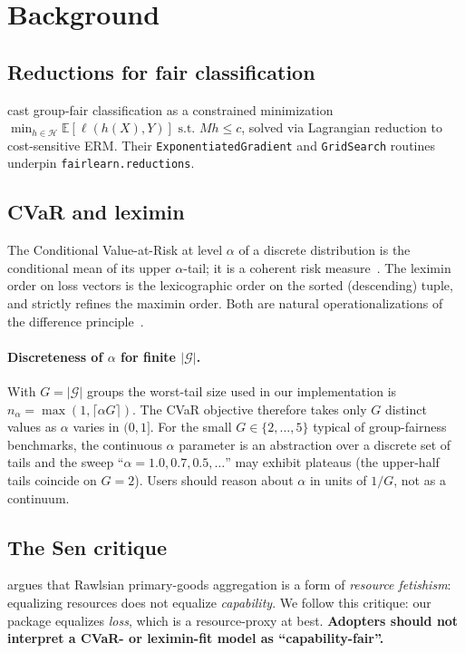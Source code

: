 \documentclass[11pt]{article}
\begin{document}
\section{Background}
\subsection{Reductions for fair classification}
\citet{agarwal2018reductions} cast group-fair classification as a
constrained minimization
$\min_{h \in \mathcal{H}} \mathbb{E}[\ell(h(X), Y)] \text{ s.t. } M h \le c$,
solved via Lagrangian reduction to cost-sensitive ERM. Their
\texttt{ExponentiatedGradient} and \texttt{GridSearch} routines underpin
\texttt{fairlearn.reductions}.

\subsection{CVaR and leximin}
The Conditional Value-at-Risk at level $\alpha$ of a discrete distribution
is the conditional mean of its upper $\alpha$-tail; it is a coherent risk
measure~\citep{rockafellar2000optimization}. The leximin order on loss
vectors is the lexicographic order on the sorted (descending) tuple, and
strictly refines the maximin order. Both are natural operationalizations
of the difference principle~\citep{rawls1971theory}.

\paragraph{Discreteness of $\alpha$ for finite $|\mathcal{G}|$.}
With $G = |\mathcal{G}|$ groups the worst-tail size used in our implementation
is $n_\alpha = \max(1, \lceil \alpha G \rceil)$. The CVaR objective therefore
takes only $G$ distinct values as $\alpha$ varies in $(0, 1]$. For the small
$G \in \{2, \dots, 5\}$ typical of group-fairness benchmarks, the continuous
$\alpha$ parameter is an abstraction over a discrete set of tails and
the sweep ``$\alpha = 1.0, 0.7, 0.5, \dots$'' may exhibit plateaus
(the upper-half tails coincide on $G = 2$). Users should reason about
$\alpha$ in units of $1/G$, not as a continuum.

\subsection{The Sen critique}
\citet{sen1979equality, sen2009idea} argues that Rawlsian primary-goods
aggregation is a form of \emph{resource fetishism}: equalizing resources
does not equalize \emph{capability}. We follow this critique: our package
equalizes \emph{loss}, which is a resource-proxy at best.
\textbf{Adopters should not interpret a CVaR- or leximin-fit model as
``capability-fair''.}
\end{document}

